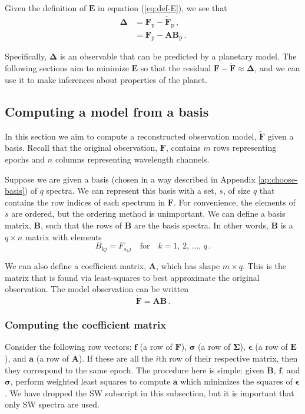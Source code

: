 \documentclass[twocolumn,linenumbers]{aastex7}
\begin{document}
Given the definition of $\mathbf{E}$ in equation (\ref{eq:def-E}), we see that
\begin{align}
    \mathbf{\Delta} &= \mathbf{F}_\text{p} - \tilde{\mathbf{F}}_\text{p}\, , \\
    & = \mathbf{F}_\text{p} - \mathbf{A}\mathbf{B}_\text{p}\, . \label{eq:calc-glob-delta}
\end{align}

Specifically, $\mathbf{\Delta}$ is an observable that can be predicted by a planetary model. The following sections aim to minimize $\mathbf{E}$ so that the residual $\mathbf{F} - \tilde{\mathbf{F}} \approx \mathbf{\Delta}$, and we can use it to make inferences about properties of the planet.

\subsection{Computing a model from a basis}
\label{ap:compute-model}
In this section we aim to compute a reconstructed observation model, $\tilde{\mathbf{F}}$ given a basis. Recall that the original observation, $\mathbf{F}$, contains $m$ rows representing epochs and $n$ columns representing wavelength channels.

Suppose we are given a basis (chosen in a way described in Appendix \ref{ap:choose-basis}) of $q$ spectra. We can represent this basis with a set, $s$, of size $q$ that contains the row indices of each spectrum in $\mathbf{F}$. For convenience, the elements of $s$ are ordered, but the ordering method is unimportant. We can define a basis matrix, $\mathbf{B}$, such that the rows of $\mathbf{B}$ are the basis spectra. In other words, $\mathbf{B}$ is a $q\times n$ matrix with elements
\begin{equation}
    B_{kj} = F_{s_kj} \quad \text{for}\quad k=1,\,2,\,\dots,\,q\,.
\end{equation}

We can also define a coefficient matrix, $\mathbf{A}$, which has shape $m\times q$. This is the matrix that is found via least-squares to best approximate the original observation. The model observation can be written
\begin{equation}
    \tilde{\mathbf{F}} = \mathbf{A}\mathbf{B}\, .
    \label{eq:f-eq-ab}
\end{equation}

\subsubsection{Computing the coefficient matrix}
\label{ap:compute-A}
Consider the following row vectors: $\bm{f}$ (a row of $\mathbf{F}$), $\bm{\sigma}$ (a row of $\mathbf{\Sigma}$), $\bm{\epsilon}$ (a row of $\mathbf{E}$), and $\bm{a}$ (a row of $\mathbf{A}$). If these are all the $i$th row of their respective matrix, then they correspond to the same epoch. The procedure here is simple: given $\mathbf{B}$, $\bm{f}$, and $\bm{\sigma}$, perform weighted least squares to compute $\bm{a}$ which minimizes the squares of $\bm{\epsilon}$. We have dropped the SW subscript in this subsection, but it is important that only SW spectra are used.
\end{document}
